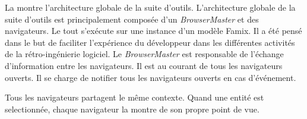 \documentclass[a4paper]{article}
\newcommand{\browserMaster}{\textit{BrowserMaster} \xspace}
\begin{document}
La  montre l'architecture globale de la suite d'outils.
L'architecture globale de la suite d'outils est principalement composée d'un \browserMaster et des navigateurs.
Le tout s'exécute sur une instance d'un modèle Famix. 
Il a été pensé dans le but de faciliter l'expérience du développeur dans les différentes activités de la rétro-ingénierie logiciel.
Le \browserMaster est responsable de l'échange d'information entre les navigateurs.
Il est au courant de tous les navigateurs ouverts. 
Il se charge de notifier tous les navigateurs ouverts en cas d'événement.

Tous les navigateurs partagent le même contexte. Quand une entité est selectionnée, chaque navigateur la montre de son propre point de vue.





\end{document}
